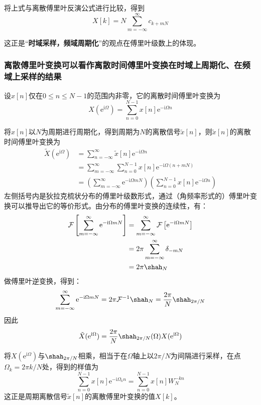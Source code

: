 将上式与离散傅里叶反演公式进行比较，得到
\[X[k]=N\sum_{m=-\infty}^{\infty}c_{k+mN}\]

这正是“\textbf{时域采样，频域周期化}”的观点在傅里叶级数上的体现。

\subsubsection{离散傅里叶变换可以看作离散时间傅里叶变换在时域上周期化、在频域上采样的结果}

设$x[n]$仅在$0\leq n\leq N-1$的范围内非零，它的离散时间傅里叶变换为
\[X(\mathrm{e}^{\mathrm{i}\Omega})=\sum_{n=0}^{N-1}x[n]\mathrm{e}^{-\mathrm{i}\Omega n}\]

将$x[n]$以$N$为周期进行周期化，得到周期为$N$的离散信号$\tilde{x}[n]$，则$\tilde{x}[n]$的离散时间傅里叶变换为
\begin{align*}
    \tilde{X}(\mathrm{e}^{\mathrm{i}\Omega})&=\sum_{n=-\infty}^{\infty}\tilde{x}[n]\mathrm{e}^{-\mathrm{i}\Omega n}\\
    &=\sum_{m=-\infty}^{\infty}\sum_{n=0}^{N-1}x[n]\mathrm{e}^{-\mathrm{i}\Omega (n+mN)}\\
    &=\left(\sum_{m=-\infty}^{\infty}\mathrm{e}^{-\mathrm{i}\Omega mN}\right)\left(\sum_{n=0}^{N-1}x[n]\mathrm{e}^{-\mathrm{i}\Omega n}\right)
\end{align*}
左侧括号内是狄拉克梳状分布的傅里叶级数形式，通过（角频率形式的）傅里叶变换可以推导出它的等价形式。由分布的傅里叶变换的连续性，有：
\begin{align*}
    \mathcal{F}\left[\sum_{m=-\infty}^{\infty}\mathrm{e}^{-\mathrm{i}\Omega mN}\right]&=\sum_{m=-\infty}^{\infty}\mathcal{F}\left[\mathrm{e}^{-\mathrm{i}\Omega mN}\right]\\
    &=2\pi\sum_{m=-\infty}^{\infty}\delta_{-mN}\\
    &=2\pi\shah_{N}
\end{align*}
做傅里叶逆变换，得到：\begin{align*}
    \sum_{m=-\infty}^{\infty}\mathrm{e}^{-\mathrm{i}\Omega mN}=2\pi\mathcal{F}^{-1}\shah_{N}=\frac{2\pi}{N}\shah_{2\pi/N}
\end{align*}
因此\begin{align*}
    \tilde{X}(\mathrm{e}^{\mathrm{i}\Omega})=\frac{2\pi}{N}\shah_{2\pi/N}(\Omega)X(\mathrm{e}^{\mathrm{i}\Omega})
\end{align*}

将$X(\mathrm{e}^{\mathrm{i}\Omega})$与$\shah_{2\pi/N}$相乘，相当于在$\Omega$轴上以$2\pi/N$为间隔进行采样，在点$\Omega_k=2\pi k/N$处，得到的样值为
$$\sum_{n=0}^{N-1}x[n]\mathrm{e}^{-\mathrm{i}\Omega_k n}=\sum_{n=0}^{N-1}x[n]W_N^{-kn}$$
这正是周期离散信号$\tilde{x}[n]$的离散傅里叶变换的值$X[k]$。

